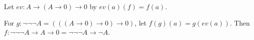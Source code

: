 \documentclass[12pt]{book}
\begin{document}
Let $ev : A \rightarrow (A \rightarrow 0) \rightarrow 0$ by $ev(a)(f) = f(a)$.

For $g : \neg\neg\neg A = (((A \rightarrow 0) \rightarrow 0) \rightarrow 0)$, let $f(g)(a) = g(ev(a))$. Then $f : \neg\neg\neg A \rightarrow A \rightarrow 0 = \neg\neg\neg A \rightarrow \neg A$.
\end{document}
